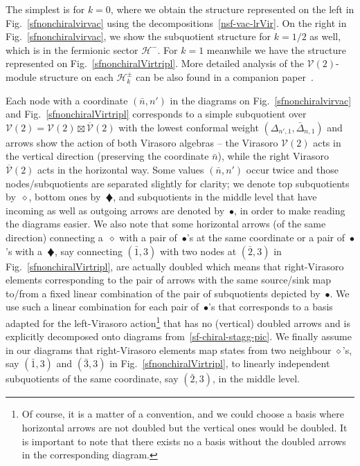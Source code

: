 \documentclass[11pt]{article}
\newcommand{\Vir}{\mathcal{V}}
\newcommand{\VirN}{\boldsymbol{\mathcal{V}}}
\newcommand{\bimnch}{\boldsymbol{\mathcal{H}}}
\newcommand{\bimnfer}{\bimnch^{-}}
\theoremstyle{definition}
\begin{document}
The simplest is for $k=0$, where we obtain the structure represented
 on the left in Fig.~\ref{sfnonchiralvirvac} using the decompositions~\eqref{nsf-vac-lrVir}. On the right in
Fig.~\ref{sfnonchiralvirvac}, we show the subquotient structure for
$k=1/2$ as well, which is in the fermionic sector $\bimnfer$.
For $k=1$ meanwhile we have the structure represented on
Fig.~\ref{sfnonchiralVirtripl}. More detailed analysis of the
$\VirN(2)$-module structure on each $\bimnch^{\pm}_k$  can be also found in a companion
paper~\cite{tobepublished}.


Each node with a coordinate $(\bar{n},n')$ in the diagrams on
Fig.~\ref{sfnonchiralvirvac} and Fig.~\ref{sfnonchiralVirtripl}
corresponds to a simple subquotient over
$\VirN(2)=\Vir(2)\boxtimes\overline{\Vir}(2)$ with the lowest
conformal weight $(\Delta_{n',1},\bar{\Delta}_{n,1})$ and arrows show
the action of both Virasoro algebras -- the Virasoro $\Vir(2)$ acts in
the vertical direction (preserving the coordinate $\bar{n}$), while
the right Virasoro $\overline{\Vir}(2)$ acts in the horizontal
way. Some values $(\bar{n},n')$ occur twice and those
nodes/subquotients are separated slightly for clarity; we denote top
subquotients by~$\diamond$, bottom ones by~{\scriptsize$\vardiamond$},
and subquotients in the middle level that have incoming as well as
outgoing arrows are denoted by~$\bullet$, in order to make reading the
diagrams easier. We also note that some horizontal arrows (of the same
direction) connecting a~$\diamond$ with a pair of~$\bullet$'s at the
same coordinate or a pair of~$\bullet$'s with
a~{\scriptsize$\vardiamond$}, say connecting $(\bar{1},3)$ with two
nodes at $(\bar{2},3)$ in Fig.~\ref{sfnonchiralVirtripl}, are actually
doubled which means that right-Virasoro elements corresponding to the
pair of arrows with the same source/sink map to/from a fixed linear
combination of the pair of subquotients depicted by~$\bullet$. We use
such a linear combination for each pair of~$\bullet$'s that
corresponds to a basis adapted for the left-Virasoro action\footnote{Of course, it is a matter of a
  convention, and we could choose a basis where horizontal arrows are
  not doubled but the vertical ones would be doubled. It is important to note that there exists no a basis without the doubled arrows in the corresponding diagram.} that has
no (vertical) doubled arrows and is explicitly decomposed onto
diagrams from~\eqref{sf-chiral-stagg-pic}. We finally assume in our
diagrams that right-Virasoro elements map states from two neighbour
$\diamond$'s, say $(\bar{1},3)$ and $(\bar{3},3)$ in
Fig.~\ref{sfnonchiralVirtripl}, to linearly independent subquotients
of the same coordinate, say $(\bar{2},3)$, in the middle level.
\end{document}
